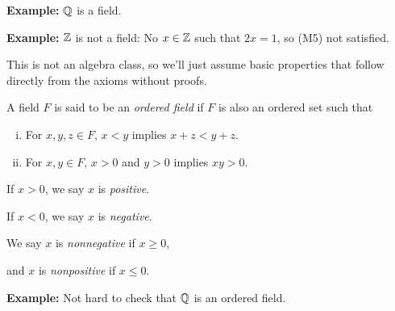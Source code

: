 \documentclass[10pt,aspectratio=169]{beamer}
\begin{document}
\begin{frame}

\textbf{Example:} ${\mathbb{Q}}$ is a field.

\medskip
\pause

\textbf{Example:} ${\mathbb{Z}}$ is not a field: No $x \in {\mathbb{Z}}$ such that $2x=1$,
so (M5) not satisfied.

\medskip
\pause

This is not an algebra class, so we'll just assume basic properties
that follow directly from the axioms without proofs.

\medskip
\pause

\begin{definition}
A field $F$ is said to be an \emph{ordered field} if
$F$ is also an ordered set such that
\begin{enumerate}[(i)]
\pause
\item \label{defn:ordfield:i} For $x,y,z \in F$,  $x < y$ implies $x+z <
y+z$.
\pause
\item \label{defn:ordfield:ii} For $x,y \in F$, $x > 0$ and $y > 0$
implies $xy > 0$.
\end{enumerate}
\pause
If $x > 0$, we say $x$ is \emph{positive}.

\pause
If $x < 0$, we say $x$ is \emph{negative}.

\pause
We say $x$ is \emph{nonnegative} if $x \geq 0$,

\pause
and $x$ is \emph{nonpositive} if $x \leq 0$.
\end{definition}

\pause

\textbf{Example:}
Not hard to check that ${\mathbb{Q}}$ is an ordered field.

\end{frame}
\end{document}
